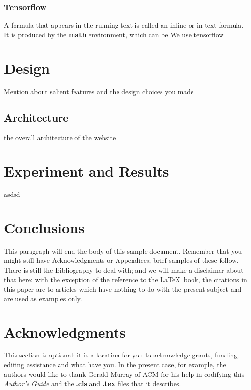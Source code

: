 \documentclass{sig-alternate-05-2015}
\begin{document}
\subsubsection{Tensorflow}
A formula that appears in the running text is called an
inline or in-text formula.  It is produced by the
\textbf{math} environment, which can be
We use tensorflow \cite{tensorflow2015-whitepaper}


\section{Design}
Mention about salient features and the design choices you made

\subsection{Architecture}
the overall architecture of the website


\section{Experiment and Results}
asdsd




\section{Conclusions}
This paragraph will end the body of this sample document.
Remember that you might still have Acknowledgments or
Appendices; brief samples of these
follow.  There is still the Bibliography to deal with; and
we will make a disclaimer about that here: with the exception
of the reference to the \LaTeX\ book, the citations in
this paper are to articles which have nothing to
do with the present subject and are used as
examples only.


\section{Acknowledgments}
This section is optional; it is a location for you
to acknowledge grants, funding, editing assistance and
what have you.  In the present case, for example, the
authors would like to thank Gerald Murray of ACM for
his help in codifying this \textit{Author's Guide}
and the \textbf{.cls} and \textbf{.tex} files that it describes.

%

%
%




\end{document}
